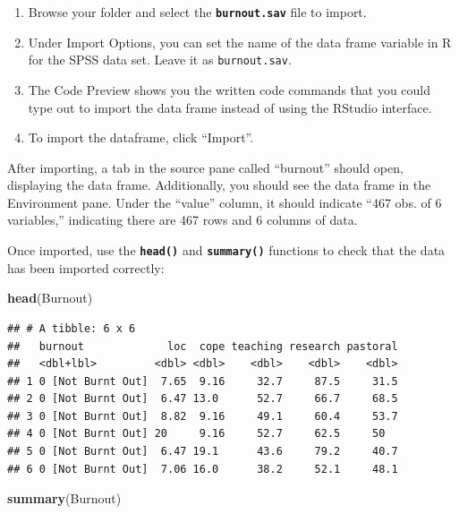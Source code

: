 \documentclass[
]{book}
\newenvironment{Shaded}{\begin{snugshade}}{\end{snugshade}}
\newcommand{\FunctionTok}[1]{\textcolor[rgb]{0.13,0.29,0.53}{\textbf{#1}}}
\newcommand{\NormalTok}[1]{#1}
\begin{document}
\begin{enumerate}
\def\labelenumi{\arabic{enumi}.}
\setcounter{enumi}{5}
\item
  Browse your folder and select the \textbf{\texttt{burnout.sav}} file to import.
\item
  Under Import Options, you can set the name of the data frame variable in R for the SPSS data set. Leave it as \texttt{burnout.sav}.
\item
  The Code Preview shows you the written code commands that you could type out to import the data frame instead of using the RStudio interface.
\item
  To import the dataframe, click ``Import''.
\end{enumerate}

After importing, a tab in the source pane called ``burnout'' should open, displaying the data frame. Additionally, you should see the data frame in the Environment pane. Under the ``value'' column, it should indicate ``467 obs. of 6 variables,'' indicating there are 467 rows and 6 columns of data.

Once imported, use the \textbf{\texttt{head()}} and \textbf{\texttt{summary()}} functions to check that the data has been imported correctly:

\begin{Shaded}
\begin{Highlighting}[]
\FunctionTok{head}\NormalTok{(Burnout)}
\end{Highlighting}
\end{Shaded}

\begin{verbatim}
## # A tibble: 6 x 6
##   burnout             loc  cope teaching research pastoral
##   <dbl+lbl>         <dbl> <dbl>    <dbl>    <dbl>    <dbl>
## 1 0 [Not Burnt Out]  7.65  9.16     32.7     87.5     31.5
## 2 0 [Not Burnt Out]  6.47 13.0      52.7     66.7     68.5
## 3 0 [Not Burnt Out]  8.82  9.16     49.1     60.4     53.7
## 4 0 [Not Burnt Out] 20     9.16     52.7     62.5     50  
## 5 0 [Not Burnt Out]  6.47 19.1      43.6     79.2     40.7
## 6 0 [Not Burnt Out]  7.06 16.0      38.2     52.1     48.1
\end{verbatim}

\begin{Shaded}
\begin{Highlighting}[]
\FunctionTok{summary}\NormalTok{(Burnout)}
\end{Highlighting}
\end{Shaded}
\end{document}
